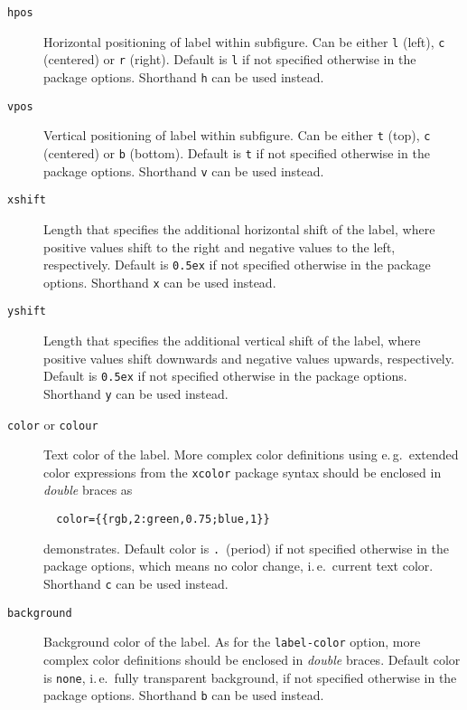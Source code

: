 \documentclass[version=3.12,american]{scrartcl}
\begin{document}
\begin{description}
\item[\texttt{hpos}\enskip] Horizontal positioning of label within subfigure. Can be either \texttt{l} (left), \texttt{c} (centered) or \texttt{r} (right). Default is \texttt{l} if not specified otherwise in the package options. Shorthand \texttt{h} can be used instead.

\item[\texttt{vpos}\enskip] Vertical positioning of label within subfigure. Can be either \texttt{t} (top), \texttt{c} (centered) or \texttt{b} (bottom). Default is \texttt{t} if not specified otherwise in the package options. Shorthand \texttt{v} can be used instead.

\item[\texttt{xshift}\enskip] Length that specifies the additional horizontal shift of the label, where positive values shift to the right and negative values to the left, respectively. Default is \texttt{0.5ex} if not specified otherwise in the package options. Shorthand \texttt{x} can be used instead.

\item[\texttt{yshift}\enskip] Length that specifies the additional vertical shift of the label, where positive values shift downwards and negative values upwards, respectively. Default is \texttt{0.5ex} if not specified otherwise in the package options. Shorthand \texttt{y} can be used instead.

\item[\texttt{color} or \texttt{colour}\enskip] Text color of the label. More complex color definitions using e.\,g.\ extended color expressions from the \texttt{xcolor} package syntax should be enclosed in \emph{double} braces as
\begin{verbatim}
  color={{rgb,2:green,0.75;blue,1}}
\end{verbatim}
demonstrates. Default color is \texttt{.}\ (period) if not specified otherwise in the package options, which means no color change, i.\,e.\ current text color. Shorthand \texttt{c} can be used instead.

\item[\texttt{background}\enskip] Background color of the label. As for the \texttt{label-color} option, more complex color definitions should be enclosed in \emph{double} braces. Default color is \texttt{none}, i.\,e.\ fully transparent background, if not specified otherwise in the package options. Shorthand \texttt{b} can be used instead.
\end{description}
\end{document}
